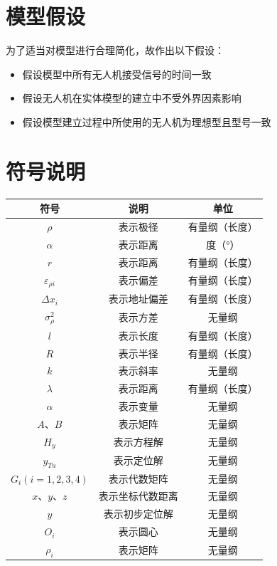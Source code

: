 

\section{模型假设}

为了适当对模型进行合理简化，故作出以下假设：

\begin{itemize}
    \item 假设模型中所有无人机接受信号的时间一致
    \item 假设无人机在实体模型的建立中不受外界因素影响
    \item 假设模型建立过程中所使用的无人机为理想型且型号一致
\end{itemize}




\section{符号说明}

\begin{table}[ht]
\centering
\begin{tabular}{ccc} 
    \hline
    \Large 符号 & \Large 说明 & \Large 单位 \\
    \hline

    $\rho$ & 表示极径 & 有量纲（长度） \\
    $\alpha$ & 表示距离 & 度（°） \\
    $r$ & 表示距离 & 有量纲（长度） \\
    $\varepsilon_{\rho i}$ & 表示偏差 & 有量纲（长度） \\
    $\Delta x_i$ & 表示地址偏差 & 有量纲（长度） \\
    $\sigma^2_\rho$ & 表示方差 & 无量纲 \\
    $l$ & 表示长度 & 有量纲（长度） \\
    $R$ & 表示半径 & 有量纲（长度） \\
    $k$ & 表示斜率 & 无量纲 \\
    $\lambda$ & 表示距离 & 有量纲（长度） \\
    $\alpha$ & 表示变量 & 无量纲 \\
    $A$、$B$ & 表示矩阵 & 无量纲 \\
    $H_y$ & 表示方程解 & 无量纲 \\
    $y_{Tu}$ & 表示定位解 & 无量纲 \\
    $G_i(i=1,2,3,4)$ & 表示代数矩阵 & 无量纲 \\
    $x$、$y$、$z$ & 表示坐标代数距离 & 无量纲 \\
    $y$ & 表示初步定位解 & 无量纲 \\
    $O_i$ & 表示圆心 & 无量纲 \\
    $\rho_i$ & 表示矩阵 & 无量纲 \\

    \hline 
\end{tabular}
\end{table}